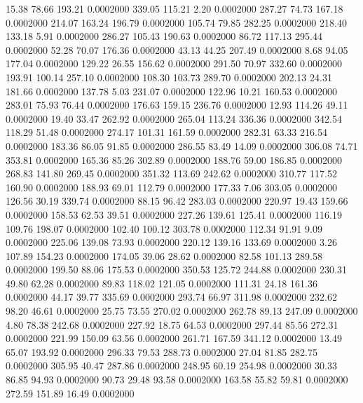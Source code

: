  15.38   78.66  193.21   0.0002000
 339.05  115.21    2.20   0.0002000
 287.27   74.73  167.18   0.0002000
 214.07  163.24  196.79   0.0002000
 105.74   79.85  282.25   0.0002000
 218.40  133.18    5.91   0.0002000
 286.27  105.43  190.63   0.0002000
  86.72  117.13  295.44   0.0002000
  52.28   70.07  176.36   0.0002000
  43.13   44.25  207.49   0.0002000
   8.68   94.05  177.04   0.0002000
 129.22   26.55  156.62   0.0002000
 291.50   70.97  332.60   0.0002000
 193.91  100.14  257.10   0.0002000
 108.30  103.73  289.70   0.0002000
 202.13   24.31  181.66   0.0002000
 137.78    5.03  231.07   0.0002000
 122.96   10.21  160.53   0.0002000
 283.01   75.93   76.44   0.0002000
 176.63  159.15  236.76   0.0002000
  12.93  114.26   49.11   0.0002000
  19.40   33.47  262.92   0.0002000
 265.04  113.24  336.36   0.0002000
 342.54  118.29   51.48   0.0002000
 274.17  101.31  161.59   0.0002000
 282.31   63.33  216.54   0.0002000
 183.36   86.05   91.85   0.0002000
 286.55   83.49   14.09   0.0002000
 306.08   74.71  353.81   0.0002000
 165.36   85.26  302.89   0.0002000
 188.76   59.00  186.85   0.0002000
 268.83  141.80  269.45   0.0002000
 351.32  113.69  242.62   0.0002000
 310.77  117.52  160.90   0.0002000
 188.93   69.01  112.79   0.0002000
 177.33    7.06  303.05   0.0002000
 126.56   30.19  339.74   0.0002000
  88.15   96.42  283.03   0.0002000
 220.97   19.43  159.66   0.0002000
 158.53   62.53   39.51   0.0002000
 227.26  139.61  125.41   0.0002000
 116.19  109.76  198.07   0.0002000
 102.40  100.12  303.78   0.0002000
 112.34   91.91    9.09   0.0002000
 225.06  139.08   73.93   0.0002000
 220.12  139.16  133.69   0.0002000
   3.26  107.89  154.23   0.0002000
 174.05   39.06   28.62   0.0002000
  82.58  101.13  289.58   0.0002000
 199.50   88.06  175.53   0.0002000
 350.53  125.72  244.88   0.0002000
 230.31   49.80   62.28   0.0002000
  89.83  118.02  121.05   0.0002000
 111.31   24.18  161.36   0.0002000
  44.17   39.77  335.69   0.0002000
 293.74   66.97  311.98   0.0002000
 232.62   98.20   46.61   0.0002000
  25.75   73.55  270.02   0.0002000
 262.78   89.13  247.09   0.0002000
   4.80   78.38  242.68   0.0002000
 227.92   18.75   64.53   0.0002000
 297.44   85.56  272.31   0.0002000
 221.99  150.09   63.56   0.0002000
 261.71  167.59  341.12   0.0002000
  13.49   65.07  193.92   0.0002000
 296.33   79.53  288.73   0.0002000
  27.04   81.85  282.75   0.0002000
 305.95   40.47  287.86   0.0002000
 248.95   60.19  254.98   0.0002000
  30.33   86.85   94.93   0.0002000
  90.73   29.48   93.58   0.0002000
 163.58   55.82   59.81   0.0002000
 272.59  151.89   16.49   0.0002000

